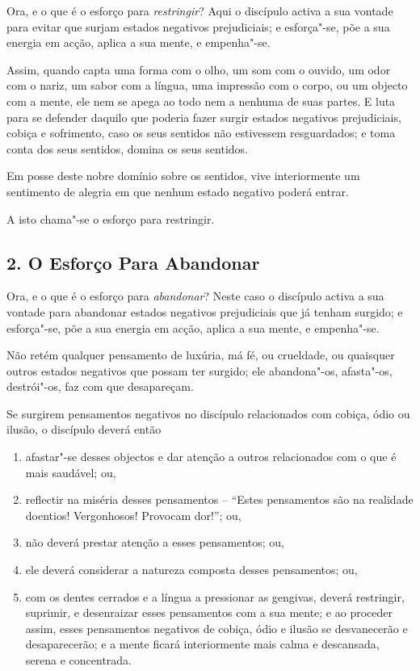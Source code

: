 
Ora, e o que é o esforço para \emph{restringir}? Aqui o discípulo activa a sua
vontade para evitar que surjam estados negativos prejudiciais; e esforça"-se, põe
a sua energia em acção, aplica a sua mente, e empenha"-se.

Assim, quando capta uma forma com o olho, um som com o ouvido, um odor com o
nariz, um sabor com a língua, uma impressão com o corpo, ou um objecto com a
mente, ele nem se apega ao todo nem a nenhuma de suas partes. E luta para se
defender daquilo que poderia fazer surgir estados negativos prejudiciais, cobiça
e sofrimento, caso os seus sentidos não estivessem resguardados; e toma conta
dos seus sentidos, domina os seus sentidos.

Em posse deste nobre domínio sobre os sentidos, vive interiormente um sentimento
de alegria em que nenhum estado negativo poderá entrar.

A isto chama"-se o esforço para restringir.

\subsection{2. O Esforço Para Abandonar}


Ora, e o que é o esforço para \emph{abandonar}? Neste caso o discípulo activa a
sua vontade para abandonar estados negativos prejudiciais que já tenham surgido;
e esforça"-se, põe a sua energia em acção, aplica a sua mente, e empenha"-se.

Não retém qualquer pensamento de luxúria, má fé, ou crueldade, ou quaisquer
outros estados negativos que possam ter surgido; ele abandona"-os, afasta"-os,
destrói"-os, faz com que desapareçam.


Se surgirem pensamentos negativos no discípulo relacionados com cobiça, ódio ou
ilusão, o discípulo deverá então

\begin{enumerate}
  \item afastar"-se desses objectos e dar atenção a outros relacionados com o que
        é mais saudável; ou,

  \item reflectir na miséria desses pensamentos -- “Estes pensamentos são na
  realidade doentios! Vergonhosos! Provocam dor!”; ou,

  \item não deverá prestar atenção a esses pensamentos; ou,

  \item ele deverá considerar a natureza composta desses pensamentos; ou,

  \item com os dentes cerrados e a língua a pressionar as gengivas, deverá
        restringir, suprimir, e desenraizar esses pensamentos com a sua mente; e
        ao proceder assim, esses pensamentos negativos de cobiça, ódio e ilusão
        se desvanecerão e desaparecerão; e a mente ficará interiormente mais
        calma e descansada, serena e concentrada.
\end{enumerate}

